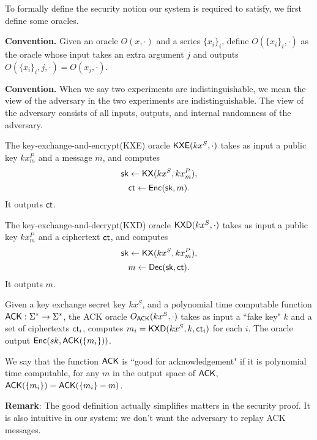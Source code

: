 
To formally define the security notion our system is required to satisfy, we first define some oracles.

\textbf{Convention.} Given an oracle $O(x, \cdot)$ and a series $\{x_i\}_i$, define $O(\{x_i\}_i, \cdot)$ as the oracle whose input takes an extra argument $j$ and outputs $O(\{x_i\}_i, j, \cdot) = O(x_j, \cdot)$.

\textbf{Convention.} When we say two experiments are indistinguishable, we mean the view of the adversary in the two experiments are indistinguishable. The view of the adversary consists of all inputs, outputs, and internal randomness of the adversary.

\begin{definition}
The key-exchange-and-encrypt(KXE) oracle $\mathsf{KXE}(kx^S, \cdot)$ takes as input a public key $kx_m^P$ and a message $m$, and computes
$${\mathsf{sk}} \leftarrow \mathsf{KX}(kx^S, kx_m^P),$$
$$\mathsf{ct} \leftarrow \mathsf{Enc}({\mathsf{sk}}, m).$$
It outputs $\mathsf{ct}$.

The key-exchange-and-decrypt(KXD) oracle $\mathsf{KXD}(kx^S, \cdot)$ takes as input a public key $kx_m^P$ and a ciphertext $\mathsf{ct}$, and computes
$${\mathsf{sk}} \leftarrow \mathsf{KX}(kx^S, kx_m^P),$$
$$m \leftarrow \mathsf{Dec}({\mathsf{sk}}, \mathsf{ct}).$$
It outputs $m$.
\end{definition}
\begin{definition}
\label{defn:ack-oracle}
Given a key exchange secret key $kx^S$, and a polynomial time computable function $\mathsf{ACK}: \Sigma^* \to \Sigma^*$, the ACK oracle $O_{\mathsf{ACK}}(kx^S, \cdot)$ takes as input a ``fake key" $k$ and a set of ciphertexts $\mathsf{ct}_i$, computes $m_i = \mathsf{KXD}(kx^S, k, \mathsf{ct}_i)$ for each $i$. The oracle output $\mathsf{Enc}(sk, \mathsf{ACK}(\{m_i\}))$.

We say that the function $\mathsf{ACK}$ is ``good for acknowledgement" if it is polynomial time computable, for any $m$ in the output space of $\mathsf{ACK}$, $\mathsf{ACK}(\{m_i\}) = \mathsf{ACK}(\{m_i\} - m)$.
\end{definition}
\textbf{Remark}: The good definition actually simplifies matters in the security proof. It is also intuitive in our system: we don't want the adversary to replay ACK messages.
